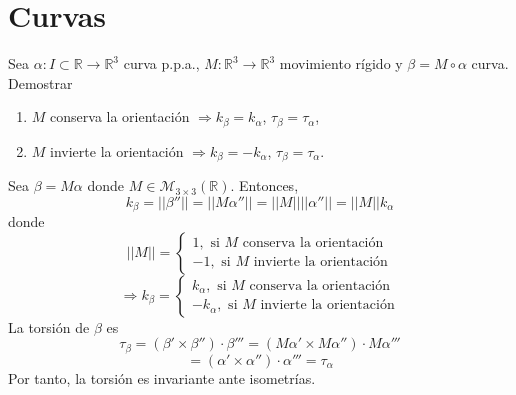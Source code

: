 \chapter{Curvas}

\begin{ejr}[33]
  Sea $\alpha  : I \subset \mathbb{R} \to \mathbb{R}^{3}$ curva p.p.a., $M: \mathbb{R}^3 \to \mathbb{R}^3$ movimiento rígido y $\beta = M \circ \alpha$ curva. Demostrar
  \begin{enumerate}[label=(\roman*)]
    \item $M$ conserva la orientación $\Rightarrow k_{\beta} = k_{\alpha}$, $\tau_{\beta} = \tau_{\alpha}$,
    \item $M$ invierte la orientación $\Rightarrow k_{\beta} = - k_{\alpha}$, $\tau_{\beta} = \tau_{\alpha}$.
  \end{enumerate}
\end{ejr}

\begin{sol}
  Sea $\beta = M \alpha$ donde $M \in \mathcal{M}_{3 \times 3}(\mathbb{R})$. Entonces,
  \[ 
    k_{\beta} = ||\beta''|| = ||M \alpha''|| = ||M|| ||\alpha''|| = ||M|| k_{\alpha}
  \]
  donde
  \[ 
    ||M||  =
    \begin{cases}
      1, \text{ si $M$ conserva la orientación} \\
      -1, \text{ si $M$ invierte la orientación}
    \end{cases}
  \] 
  \[ 
    \Rightarrow k_{\beta} =
    \begin{cases}
      k_{\alpha}, \text{ si $M$ conserva la orientación} \\
      -k_{\alpha}, \text{ si $M$ invierte la orientación}
    \end{cases}
  \] 
  La torsión de $\beta$ es
  \[ 
   \tau_{\beta} = (\beta ' \times \beta '') \cdot \beta''' = (M \alpha' \times M \alpha'') \cdot M \alpha'''
  \] 
  \[ 
    = (\alpha' \times \alpha'') \cdot \alpha''' = \tau_{\alpha} 
  \] 
  Por tanto, la torsión es invariante ante isometrías.
\end{sol}
